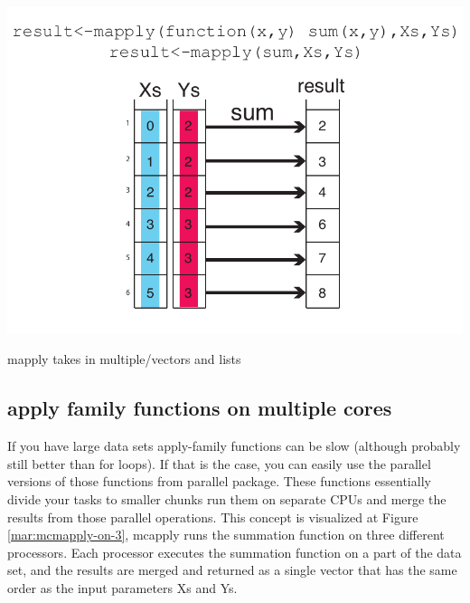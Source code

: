 \documentclass[english,nohyper]{tufte-book}\usepackage[]{graphicx}\usepackage[]{color}
\begin{document}
\begin{marginfigure}
\includegraphics[clip,scale=0.5]{3_Users_altuna_Dropbox_PAPERS_R-devel_compgenr_chapters_nonR_figures_mapply.pdf}

\caption{mapply takes in multiple/vectors and lists\label{mar:mapply-takes-in}}
\end{marginfigure}



\subsection{apply family functions on multiple cores}

If you have large data sets apply-family functions can be slow (although
probably still better than for loops). If that is the case, you can
easily use the parallel versions of those functions from parallel
package. These functions essentially divide your tasks to smaller
chunks run them on separate CPUs and merge the results from those
parallel operations. This concept is visualized at Figure \ref{mar:mcmapply-on-3},
mcapply runs the summation function on three different processors.
Each processor executes the summation function on a part of the data
set, and the results are merged and returned as a single vector that
has the same order as the input parameters Xs and Ys.
\end{document}
